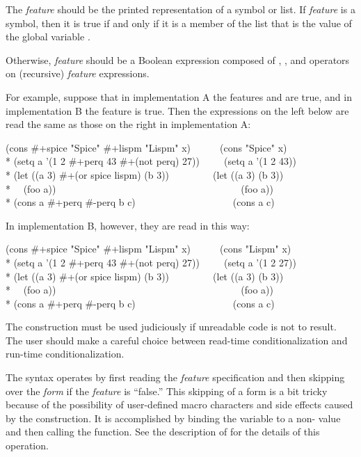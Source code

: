 \begin{flushdesc}
The \emph{feature} should be the printed representation of a symbol or list.
If \emph{feature} is a symbol, then 
it is true if and only if it is a member of the list that is the value of
the global variable .

Otherwise,
\emph{feature} should be a Boolean expression composed of , , and
 operators on (recursive) \emph{feature} expressions.

For example, suppose that in implementation A the features  and
 are true, and in implementation B the feature  is true.
Then the expressions on the left below are read the same as those on the
right in implementation A:
\begin{lisp}
(cons \#+spice "Spice" \#+lispm "Lispm" x)~~~~~~(cons "Spice" x) \\*
(setq a '(1 2 \#+perq 43 \#+(not perq) 27))~~~~~(setq a '(1 2 43)) \\*
(let ((a 3) \#+(or spice lispm) (b 3))~~~~~~~~~(let ((a 3) (b 3)) \\*
~~(foo a))~~~~~~~~~~~~~~~~~~~~~~~~~~~~~~~~~~~~~~(foo a))\\*
(cons a \#+perq \#-perq b c)~~~~~~~~~~~~~~~~~~~~(cons a c)
\end{lisp}
In implementation B, however, they are read in this way:
\begin{lisp}
(cons \#+spice "Spice" \#+lispm "Lispm" x)~~~~~~(cons "Lispm" x) \\*
(setq a '(1 2 \#+perq 43 \#+(not perq) 27))~~~~~(setq a '(1 2 27)) \\*
(let ((a 3) \#+(or spice lispm) (b 3))~~~~~~~~~(let ((a 3) (b 3)) \\*
~~(foo a))~~~~~~~~~~~~~~~~~~~~~~~~~~~~~~~~~~~~~~(foo a))\\*
(cons a \#+perq \#-perq b c)~~~~~~~~~~~~~~~~~~~~(cons a c)
\end{lisp}

\newpage%

The \cd{\#+} construction must be used judiciously if unreadable code is
not to result.  The user should make a careful choice between read-time
conditionalization and run-time conditionalization.

The \cd{\#+} syntax operates by first reading the \emph{feature} specification
and then skipping over the \emph{form} if the \emph{feature} is ``false.''
This skipping of a form is a bit tricky because of the possibility of
user-defined macro characters and side effects caused by the 
construction.  It is accomplished by binding the variable 
 to a non-{\nil} value and then calling the 
function.  See the description of  for the details
of this operation.


\end{flushdesc}
